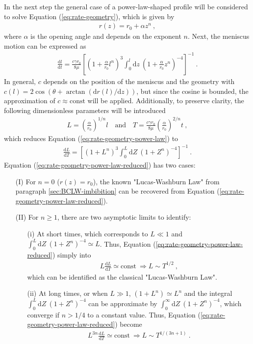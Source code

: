 \documentclass[aip, amsmath, amssymb, reprint, twocolumn, floatfix]{revtex4-1}
\newcommand{\dldt}{\frac{\mathrm{d}l}{\mathrm{d}t}}
\newcommand{\dLdT}{\frac{\mathrm{d}L}{\mathrm{d}T}}
\newcommand{\dz}{\mathrm{d}z}
\newcommand{\dZ}{\mathrm{d}Z}
\begin{document}
In the next step the general case of a power-law-shaped profile will be considered to solve Equation (\ref{eq:rate-geometry}), which is given by
\begin{gather}
	r(z) = r_0 + \alpha z^n~,
	\label{eq:power-law}
\end{gather}
where $\alpha$ is the opening angle and depends on the exponent $n$. Next, the meniscus motion can be expressed as 
\begin{gather}
	\dldt = \frac{c \gamma r_0}{8\mu} \left[ \left(1 + \frac{\alpha}{r_0} l^n \right)^3 \int_0^{l}\!\!\!\dz~\left(1 + \frac{\alpha}{r_0} z^n \right)^{-4} \right]^{-1}~.
	\label{eq:rate-geometry-power-law}
\end{gather}
In general, $c$ depends on the position of the meniscus and the geometry with $c(l) = 2\cos(\theta + \arctan(\mathrm{d}r(l)/\mathrm{d}z))$, but since the cosine is bounded, the approximation of $c \approx \text{const}$ will be applied. Additionally, to preserve clarity, the following dimensionless parameters will be introduced
\begin{gather}
	L = \left(\frac{\alpha}{r_0}\right)^{1/n} l\quad\text{and}\quad T = \frac{c\gamma r_0}{8\mu} \left(\frac{\alpha}{r_0}\right)^{2/n} t~,
\end{gather}
which reduces Equation (\ref{eq:rate-geometry-power-law}) to
\begin{gather}
	\dLdT = \left[ \left(1 + L^n \right)^3 \int_0^{L}\!\!\!\dZ~\left(1 + Z^n \right)^{-4} \right]^{-1}~.
	\label{eq:rate-geometry-power-law-reduced}
\end{gather}
Equation (\ref{eq:rate-geometry-power-law-reduced}) has two cases:
\begin{itemize}
	\item[(I)] For $n = 0$ ($r(z) = r_0$), the known "Lucas-Washburn Law" from paragraph \ref{sec:BCLW-imbibition} can be recovered from Equation (\ref{eq:rate-geometry-power-law-reduced}).
	\item[(II)] For $n \ge 1$, there are two asymptotic limits to identify:
	\begin{itemize}
		\item[(i)] At short times, which corresponds to $L \ll 1$ and $\int_0^{L}\!\dZ~\left(1 + Z^n \right)^{-4} \simeq L$. Thus, Equation (\ref{eq:rate-geometry-power-law-reduced}) simply into
		\begin{gather}
			L \dLdT \simeq \text{const}~ \Rightarrow \boxed{L \sim T^{1/2}}~,
		\end{gather}
		which can be identified as the classical "Lucas-Washburn Law".
		\item[(ii)]  At long times, or when $L \gg 1$, $(1+L^n) \simeq L^n$ and the integral $\int_0^{L}\!\!\!\dZ~\left(1 + Z^n \right)^{-4}$ can be approximate by $\int_0^{\infty}\!\dZ~\left(1 + Z^n \right)^{-4}$, which converge if $n > 1/4$ to a constant value. Thus, Equation (\ref{eq:rate-geometry-power-law-reduced}) become
		\begin{gather}
			L^{3n} \dLdT \simeq \text{const}~\Rightarrow \boxed{L \sim T^{1/(3n+1)}}~.
		\end{gather}
	\end{itemize}
\end{itemize}
\end{document}
